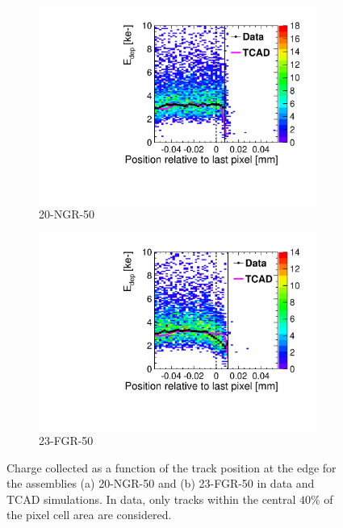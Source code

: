 \begin{figure}[htbp]
  \begin{subfigure}[b]{0.45\textwidth}
    \centering
    \includegraphics[width=\textwidth]{figures/ActiveEdge/20_NGR_Edep_TCAD_data.pdf}
    \caption{20-NGR-50}\label{fig:ChargeCollection20NGR}
  \end{subfigure}\hfill
  \begin{subfigure}[b]{0.45\textwidth}
    \centering
    \includegraphics[width=\textwidth]{figures/ActiveEdge/23_FGR_Edep_TCAD_data.pdf}
    \caption{23-FGR-50}\label{fig:ChargeCollection23FGR}
  \end{subfigure}
  \caption{Charge collected as a function of the track position at the
    edge for the assemblies (a) 20-NGR-50 and (b) 23-FGR-50 in data
    and TCAD simulations. In data, only tracks within the central
    $40\%$ of the pixel cell area are considered.}
  \label{fig:ChargeCollectionNGRFGR}
\end{figure}



